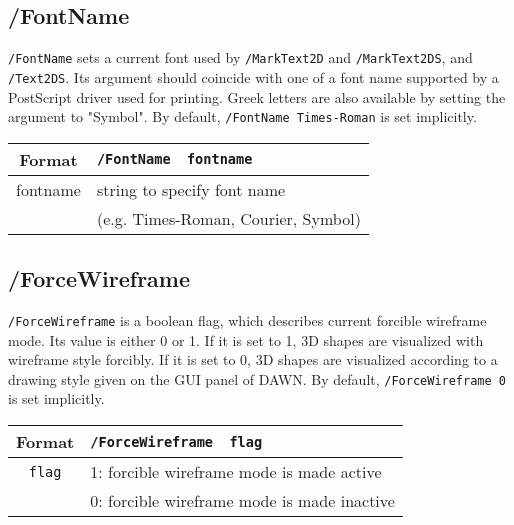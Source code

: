 \subsection{/FontName}  
\verb+/FontName+ sets a current font used by 
\verb+/MarkText2D+ and \verb+/MarkText2DS+, and \verb+/Text2DS+. 
Its argument should coincide with one of a font name supported by 
a PostScript driver used for printing.
Greek letters are also available by setting the argument to "Symbol".
By default, \verb+/FontName Times-Roman+ is set implicitly. 
\vspace{.20in}

\begin{tabular}{|c|l|}
\hline%
Format     & \verb+/FontName  fontname+\\
\hline%
fontname   &  string to specify font name \\
           &  (e.g. Times-Roman, Courier, Symbol) \\
\hline%
\end{tabular}



\subsection{/ForceWireframe}  
\verb+/ForceWireframe+ is a boolean flag, which describes current 
forcible wireframe mode.
Its value is either 0 or 1.
If it is set to 1, 3D shapes are visualized with 
wireframe style forcibly.
If it is set to 0, 3D shapes are visualized according to 
a drawing style given on the GUI panel of DAWN.
By default, \verb+/ForceWireframe 0+ is set implicitly. 
\vspace{.20in}

\begin{tabular}{|c|l|}
\hline%
Format     & \verb+/ForceWireframe  flag+\\
\hline%
\verb+flag+       & 1: forcible wireframe mode is made active\\
                  & 0: forcible wireframe mode is made inactive \\
\hline%
\end{tabular}
\vspace{.20in}

